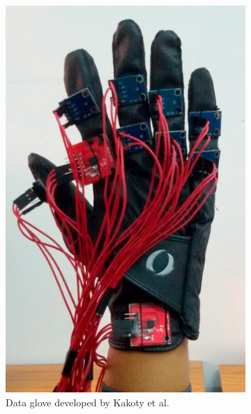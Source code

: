 \documentclass[hyperref, bachelorofscience]{cgvpub}
\begin{document}
\begin{figure}
	\begin{subfigure}{.4\linewidth}
		\includegraphics[width=\linewidth]{../pics/kakoty_glove}
		\caption{Data glove developed by Kakoty et al.}
		\label{fig:kakoty_glove}
	\end{subfigure}
	\hfill
	\begin{subfigure}{.43\linewidth}

\end{subfigure}
\end{figure}
\end{document}
